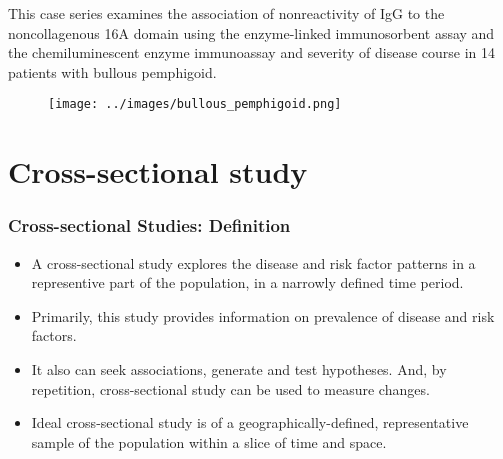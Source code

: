 \documentclass[table,10pt]{beamer}
\begin{document}
\begin{CJK*}{UTF8}{gbsn}
\begin{frame}[t]
This case series examines the association of nonreactivity of IgG to the 
noncollagenous 16A domain using the enzyme-linked immunosorbent assay and 
the chemiluminescent enzyme immunoassay and severity of disease course in 
14 patients with bullous pemphigoid.

\begin{figure}
\texttt{[image: ../images/bullous\_pemphigoid.png]}
\end{figure}
\end{frame}

\section{Cross-sectional study}

\begin{frame}[t]
\frametitle{Cross-sectional Studies: Definition}
\begin{itemize}
	\item A cross-sectional study explores the disease and risk factor 
		patterns in a representive part of the population, in a 
		narrowly defined time period.
	\item Primarily, this study provides information on \alert{prevalence} 
		of disease and risk factors.
	\item It also can seek associations, generate and test hypotheses. And, 
		by repetition, cross-sectional study can be used to measure 
		changes.
	\item Ideal cross-sectional study is of a geographically-defined, 
		representative sample of the population within a slice of 
		time and space.    
\end{itemize}
\end{frame}


\end{CJK*}
\end{document}

